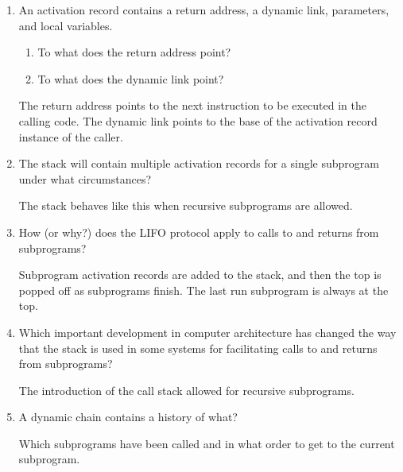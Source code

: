 \begin{enumerate}
  \item An activation record contains a return
    address, a dynamic link, parameters, and
    local variables.
  \begin{enumerate}
    \item To what does the return address point?
    \item To what does the dynamic link point?
    \end{enumerate}

  \begin{answer}
    The return address points to the next instruction to be executed in the calling 
    code.
    The dynamic link points to the base of the activation record instance of the 
    caller.
    \end{answer}

  \item The stack will contain multiple activation
    records for a single subprogram under what
    circumstances?

  \begin{answer}
    The stack behaves like this when recursive subprograms are allowed.
    \end{answer}

  \item How (or why?) does the LIFO protocol apply to
    calls to and returns from subprograms?

  \begin{answer}
    Subprogram activation records are added to the stack, and then the top is popped
    off as subprograms finish. The last run subprogram is always at the top.
    \end{answer}

  \item Which important development in computer architecture
    has changed the way that the stack is used in some
    systems for facilitating calls to and returns from
    subprograms?

  \begin{answer}
    The introduction of the call stack allowed for recursive subprograms.
    \end{answer}

  \item A dynamic chain contains a history of what?

  \begin{answer}
    Which subprograms have been called and in what order to get to the current 
    subprogram.
    \end{answer}


\end{enumerate}
